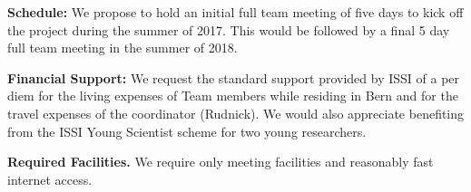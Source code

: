 \documentclass[11pt]{article}
\begin{document}
\textbf{Schedule:} We propose to hold an initial full team meeting of five days to kick off the project during the summer of 2017. This would be followed by a final 5 day full team meeting in the summer of 2018. 

\textbf{Financial Support:} We request the standard support provided
by ISSI of a per diem for the living expenses of Team members while
residing in Bern and for the travel expenses of the coordinator
(Rudnick). We would also appreciate benefiting from the ISSI Young
Scientist scheme for two young researchers.  

\textbf{Required Facilities.}  We require only meeting facilities and
reasonably fast internet access.



\end{document}
